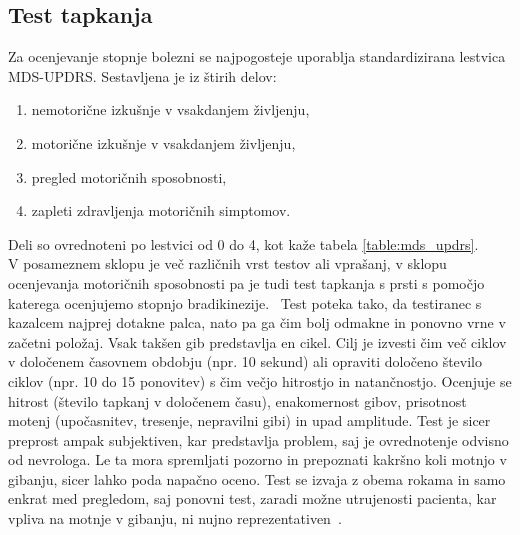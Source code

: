 \documentclass[a4paper,12pt]{article}
\begin{document}
\subsection{Test tapkanja}

Za ocenjevanje stopnje bolezni se najpogosteje uporablja standardizirana lestvica MDS-UPDRS. Sestavljena je 
iz štirih delov:

\begin{enumerate}
    \item nemotorične izkušnje v vsakdanjem življenju,
    \item motorične izkušnje v vsakdanjem življenju,
    \item pregled motoričnih sposobnosti,
    \item zapleti zdravljenja motoričnih simptomov.
\end{enumerate}

Deli so ovrednoteni po lestvici od 0 do 4, kot kaže tabela \ref{table:mds_updrs}.\\

V posameznem sklopu je več različnih vrst testov ali vprašanj, v sklopu ocenjevanja motoričnih sposobnosti pa je 
tudi test tapkanja s prsti s pomočjo katerega ocenjujemo stopnjo bradikinezije. \
Test poteka tako, da testiranec s kazalcem najprej dotakne palca, nato pa ga čim bolj odmakne in ponovno vrne 
v začetni položaj. Vsak takšen gib predstavlja en cikel. Cilj je izvesti čim več ciklov v določenem časovnem 
obdobju (npr. 10 sekund) ali opraviti določeno število ciklov (npr. 10 do 15 ponovitev) s čim večjo hitrostjo in 
natančnostjo. Ocenjuje se hitrost (število tapkanj v določenem času), enakomernost gibov, prisotnost 
motenj (upočasnitev, tresenje, nepravilni gibi) in upad amplitude. Test je sicer preprost ampak subjektiven, 
kar predstavlja problem, saj je ovrednotenje odvisno od nevrologa. Le ta mora spremljati pozorno in 
prepoznati kakršno koli motnjo v gibanju, sicer lahko poda napačno oceno. Test se izvaja z obema rokama in 
samo enkrat med pregledom, saj ponovni test, zaradi možne utrujenosti pacienta, kar vpliva na motnje v 
gibanju, ni nujno reprezentativen~\cite{Goetz, Khana}. 
\end{document}
